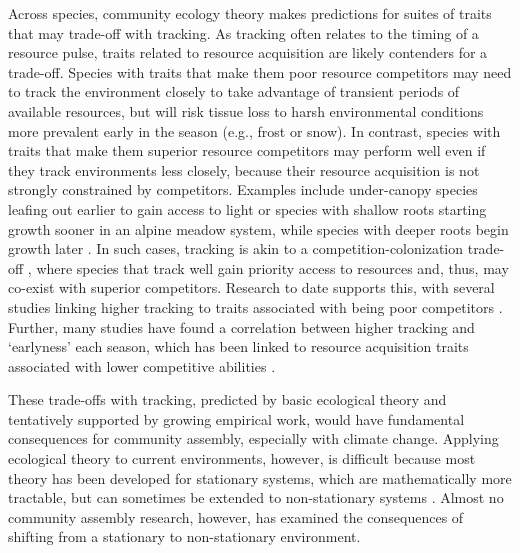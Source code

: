 \documentclass[11pt,letterpaper]{article}
\begin{document}
Across species, community ecology theory makes predictions for suites of traits that may trade-off with tracking. As tracking often relates to the timing of a resource pulse, traits related to resource acquisition are likely contenders for a trade-off. Species with traits that make them poor resource competitors may need to track the environment closely to take advantage of transient periods of available resources, but will risk tissue loss to harsh environmental conditions more prevalent early in the season (e.g., frost or snow). In contrast, species with traits that make them superior resource competitors may perform well even if they track environments less closely, because their resource acquisition is not strongly constrained by competitors. Examples include under-canopy species leafing out earlier to gain access to light \citep{heberling2019} or species with shallow roots starting growth sooner in an alpine meadow system, while species with deeper roots begin growth later \citep{Zhu2016BioLetters}. In such cases, tracking is akin to a competition-colonization trade-off \citep{Amarasekare:2003tq}, where species that track well gain priority access to resources and, thus, may co-exist with superior competitors. Research to date supports this, with several studies linking higher tracking to traits associated with being poor competitors \citep{Dorji2013,lasky2016,Zhu2016BioLetters}. Further, many studies have found a correlation between higher tracking and `earlyness' each season, which has been linked to resource acquisition traits associated with lower competitive abilities \citep[][see Box `Trait trade-offs with tracking']{wolkovich2014aob}. 

These trade-offs with tracking, predicted by basic ecological theory and tentatively supported by growing empirical work, would have fundamental consequences for community assembly, especially with climate change. Applying ecological theory to current environments, however, is difficult because most theory has been developed for stationary systems, which are mathematically more tractable, but can sometimes be extended to non-stationary systems \citep{chessonnonstat}. Almost no community assembly research, however, has examined the consequences of shifting from a stationary to non-stationary environment. %
\end{document}
